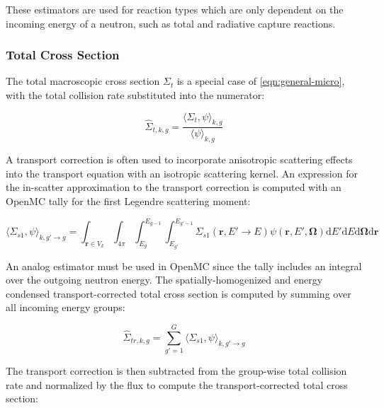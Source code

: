 These estimators are used for reaction types which are only dependent on the incoming energy of a neutron, such as total and radiative capture reactions.

\subsubsection{Total Cross Section}
\label{subsubsec:tally-types-tot-xs}

The total macroscopic cross section $\Sigma_{t}$ is a special case of \autoref{eqn:general-micro}, with the total collision rate substituted into the numerator:

\begin{equation}
\label{eqn:total-macro}
\hat{\Sigma}_{t,k,g} = \frac{\langle \Sigma_{t}, \psi \rangle_{k,g}}{\langle \psi \rangle_{k,g}}
\end{equation}

A transport correction is often used to incorporate anisotropic scattering effects into the transport equation with an isotropic scattering kernel. An expression for the in-scatter approximation \cite{yamamoto2008simplified} to the transport correction is computed with an OpenMC tally for the first Legendre scattering moment:

\begin{equation}
\label{eqn:sigs1}
\langle \Sigma_{s1}, \psi \rangle_{k,g'\rightarrow g} = \int_{\mathbf{r} \in V_{k}} \int_{4\pi} \int_{E_{g}}^{E_{g-1}} \int_{E_{g'}}^{E_{g'-1}} \Sigma_{s1}(\mathbf{r},E'\rightarrow E)\psi(\mathbf{r},E',\mathbf{\Omega}) \mathrm{d}E'\mathrm{d}E\mathrm{d}\mathbf{\Omega}\mathrm{d}\mathbf{r}
\end{equation}

\noindent An analog estimator must be used in OpenMC since the tally includes an integral over the outgoing neutron energy. The spatially-homogenized and energy condensed transport-corrected total cross section is computed by summing over all incoming energy groups:

\begin{equation}
\label{eqn:transport-corr-macro}
\hat{\Sigma}_{tr,k,g} = \displaystyle\sum\limits_{g'=1}^{G} \langle{\Sigma_{s1}, \psi \rangle_{k,g'\rightarrow g}}
\end{equation}

\noindent The transport correction is then subtracted from the group-wise total collision rate and normalized by the flux to compute the transport-corrected total cross section:

